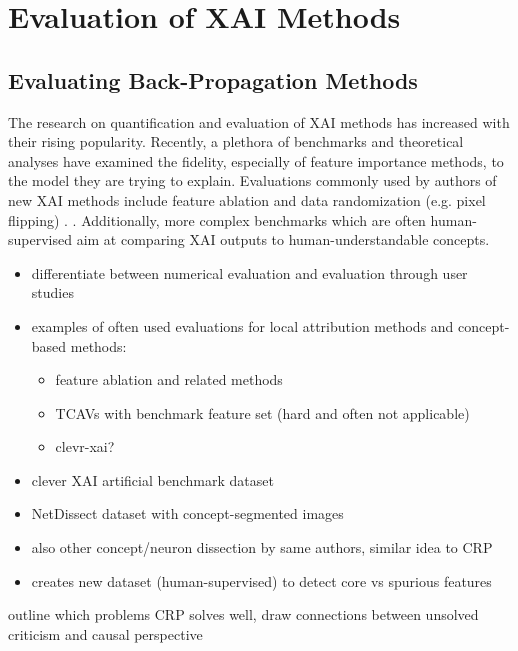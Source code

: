 \section{Evaluation of XAI Methods}



\subsection{Evaluating Back-Propagation Methods}

The research on quantification and evaluation of XAI methods has increased with their rising popularity. Recently, a plethora of benchmarks and theoretical analyses have examined the fidelity, especially of feature importance methods, to the model they are trying to explain. Evaluations commonly used by authors of new XAI methods include feature ablation and data randomization (e.g. pixel flipping) . . Additionally, more complex benchmarks \cite{Kim2018, Arras2022, Bau2017, Singla2022} which are often human-supervised aim at comparing XAI outputs to human-understandable concepts. 


\begin{itemize}
      \item differentiate between numerical evaluation and evaluation through user studies
      \item examples of often used evaluations for local attribution methods and concept-based methods:
            \begin{itemize}
                  \item feature ablation and related methods
                  \item TCAVs \cite{Kim2018} with benchmark feature set (hard and often not applicable)
                  \item clevr-xai? \cite{Arras2022}
            \end{itemize}
      \item clever XAI artificial benchmark dataset \cite{Arras2022}
      \item NetDissect dataset with concept-segmented images \cite{Bau2017}
      \item also other concept/neuron dissection by same authors, similar idea to CRP \cite{Bau2020}
      \item creates new dataset (human-supervised) to detect core vs spurious features \cite{Singla2022}
\end{itemize}
{\color{red} outline which problems CRP solves well, draw connections between unsolved criticism and causal perspective}


